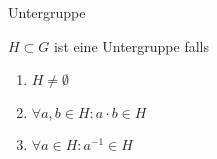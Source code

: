 \documentclass[class=article, crop=false]{standalone}
\begin{document}
\begin{zettel}{Untergruppe}
\begin{flashcard}
    \begin{definition}[Untergruppe]
        $H \subset G$ ist eine Untergruppe falls
    \begin{enumerate}
        \item $H \neq \emptyset$ 
        \item $\forall a,b \in  H \colon a \cdot b \in  H$ 
        \item $\forall a \in  H \colon a^{-1} \in  H$ 
    \end{enumerate}
\end{definition}

\end{flashcard}
\end{zettel}
\end{document}
